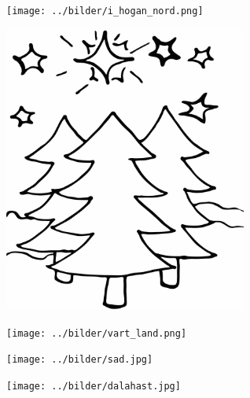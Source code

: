 %

\begin{intersong}
\sffamily\bfseries\LARGE{}
\begin{center}
\texttt{[image: ../bilder/i\_hogan\_nord.png]} 
\end{center}
\end{intersong}
\sclearpage
\begin{intersong}
\begin{center}
\includegraphics[width=8cm]{../bilder/fardigabilder/BilderTillKapitel/julstjarna.png} 
\end{center}
\end{intersong}

\begin{intersong}
\begin{center}
\texttt{[image: ../bilder/vart\_land.png]} 
\end{center}
\end{intersong}
\sclearpage

\sclearpage

\sclearpage

\sclearpage

\begin{intersong}
\begin{center}
\texttt{[image: ../bilder/sad.jpg]} 
\end{center}
\end{intersong}
\sclearpage

\sclearpage

\sclearpage

\sclearpage

\sclearpage

\sclearpage

\sclearpage

\sclearpage

\sclearpage

\begin{intersong}
\begin{center}
\texttt{[image: ../bilder/dalahast.jpg]} 
\end{center}
\end{intersong}
\sclearpage

\sclearpage

\sclearpage
